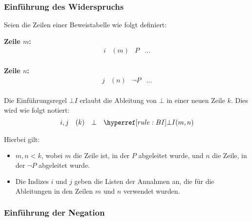 \documentclass[main.tex]{subfiles}
\begin{document}
\subsubsection{Einführung des Widerspruchs}
\label{rule:BI}

\begin{definition}
Seien die Zeilen einer Beweistabelle wie folgt definiert:

\textbf{Zeile \(m\):}
\[
\begin{array}{llll}
    i & (m) & P & \dots \\
\end{array}
\]

\textbf{Zeile \(n\):}
\[
\begin{array}{llll}
    j & (n) & \neg P & \dots \\
\end{array}
\]

Die Einführungsregel \(\bot I\) erlaubt die Ableitung von \(\bot\) in einer neuen Zeile \(k\). Dies wird wie folgt notiert:
\[
\begin{array}{llll}
    i, j & (k) & \bot & \rBI{m,n} \\
\end{array}
\]

Hierbei gilt:
\begin{itemize}
    \item \(m, n < k\), wobei \(m\) die Zeile ist, in der \(P\) abgeleitet wurde, und \(n\) die Zeile, in der \(\neg P\) abgeleitet wurde.
    \item Die Indizes \(i\) und \(j\) geben die Listen der Annahmen an, die für die Ableitungen in den Zeilen \(m\) und \(n\) verwendet wurden.
\end{itemize}
\end{definition}

\subsubsection{Einführung der Negation}
\label{rule:CI}
\end{document}
